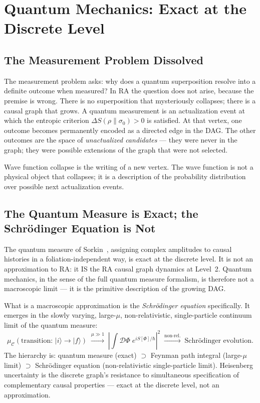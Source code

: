 \documentclass[11pt,a4paper]{article}
\begin{document}
\section{Quantum Mechanics: Exact at the Discrete Level}
\label{sec:QM}

\subsection{The Measurement Problem Dissolved}

The measurement problem asks: why does a quantum superposition resolve
into a definite outcome when measured? In RA the question does not arise,
because the premise is wrong. There is no superposition that mysteriously
collapses; there is a causal graph that grows. A quantum measurement is an
actualization event at which the entropic criterion $\Delta S(\rho\|\sigma_0)
> 0$ is satisfied. At that vertex, one outcome becomes permanently encoded
as a directed edge in the DAG. The other outcomes are the space of
\emph{unactualized candidates} --- they were never in the graph; they were
possible extensions of the graph that were not selected.

Wave function collapse is the writing of a new vertex. The wave function
is not a physical object that collapses; it is a description of the
probability distribution over possible next actualization events.

\subsection{The Quantum Measure is Exact; the Schr\"{o}dinger Equation is Not}

The quantum measure of Sorkin~\citep{Sorkin1994}, assigning complex
amplitudes to causal histories in a foliation-independent way, is exact
at the discrete level. It is not an approximation to RA: it IS the RA
causal graph dynamics at Level~2. Quantum mechanics, in the sense of the
full quantum measure formalism, is therefore not a macroscopic limit ---
it is the primitive description of the growing DAG.

What is a macroscopic approximation is the \emph{Schr\"odinger equation}
specifically. It emerges in the slowly varying, large-$\mu$,
non-relativistic, single-particle continuum limit of the quantum measure:
\begin{equation}
  \mu_{\mathcal{C}}(\text{transition: } |i\rangle \to |f\rangle)
  \;\xrightarrow{\mu \gg 1}\;
  \left|\int \mathcal{D}\Phi\; e^{iS[\Phi]/\hbar}\right|^2
  \;\xrightarrow{\text{non-rel.}}\;
  \text{Schr\"odinger evolution.}
  \label{eq:schrodinger_limit}
\end{equation}
The hierarchy is: quantum measure (exact) $\supset$ Feynman path integral
(large-$\mu$ limit) $\supset$ Schr\"odinger equation (non-relativistic
single-particle limit). Heisenberg uncertainty is the discrete graph's
resistance to simultaneous specification of complementary causal properties
--- exact at the discrete level, not an approximation.
\end{document}
